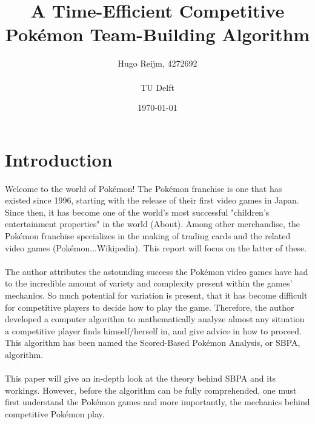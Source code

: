 \documentclass{article}
\title{A Time-Efficient Competitive Pok\'emon Team-Building Algorithm}
\author{Hugo Reijm, 4272692\\\\TU Delft}
\date{\today}
\begin{document}
\maketitle
\newpage
\tableofcontents

\newpage
\section{Introduction}
Welcome to the world of Pok\'emon! The Pok\'emon franchise is one that has existed since 1996, starting with the release of their first video games in Japan. Since then, it has become one of the world's most successful "children's entertainment properties" in the world (About). Among other merchandise, the Pok\'emon franchise specializes in the making of trading cards and the related video games (Pok\'emon...Wikipedia). This report will focus on the latter of these.\\\\
The author attributes the astounding success the Pok\'emon video games have had to the incredible amount of variety and complexity present within the games' mechanics. So much potential for variation is present, that it has become difficult for competitive players to decide how to play the game. Therefore, the author developed a computer algorithm to mathematically analyze almost any situation a competitive player finds himself/herself in, and give advice in how to proceed. This algorithm has been named the Scored-Based Pok\'emon Analysis, or SBPA, algorithm.\\\\
This paper will give an in-depth look at the theory behind SBPA and its workings. However, before the algorithm can be fully comprehended, one must first understand the Pok\'emon games and more importantly, the mechanics behind competitive Pok\'emon play.
\end{document}
